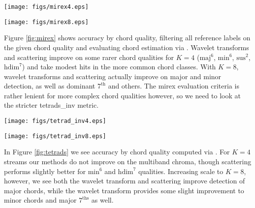 \begin{figure*}[h!]
\centering
\begin{minipage}{\columnwidth}
	\centering
	\texttt{[image: figs/mirex4.eps]}
\end{minipage}
\begin{minipage}{\columnwidth}
	\centering
	\texttt{[image: figs/mirex8.eps]}
\end{minipage}
\caption{Multiband chroma, Haar wavelet transform, and deep Haar scattering compared for $K=4$ (top) and $K=8$ (bottom) streams. Chord accuracy computed via mirex.}
\label{fig:mirex}
\end{figure*}

Figure \ref{fig:mirex} shows accuracy by chord quality, filtering all reference labels on the given chord quality and evaluating chord estimation via \mirex. Wavelet transforms and scattering improve on some rarer chord qualities for $K=4$
($\textrm{maj}^\textrm{6}$, $\textrm{min}^\textrm{6}$,
$\textrm{sus}^\textrm{2}$, $\textrm{hdim}^\textrm{7}$)
and take modest hits in the more common chord classes. With $K=8$, wavelet transforms and scattering actually improve on major and minor detection, as well as dominant $\textrm{7}^\textrm{th}$ and others. The mirex evaluation criteria is rather lenient for more complex chord qualities however, so we need to look at the stricter tetrads\_inv metric.

\begin{figure*}[h!]
\centering
\begin{minipage}{\columnwidth}
	\centering
	\texttt{[image: figs/tetrad\_inv4.eps]}
\end{minipage}
\begin{minipage}{\columnwidth}
	\centering
	\texttt{[image: figs/tetrad\_inv8.eps]}
\end{minipage}
\caption{Multiband chroma, Haar wavelet transform, and deep Haar scattering compared for $K=4$ (top) and $K=8$ (bottom) streams. Chord accuracy computed via tetrads with inversions.}
\label{fig:tetrads}
\end{figure*}

In Figure \ref{fig:tetrads} we see accuracy by chord quality computed via \tetradsinv.
For $K=4$ streams our methods do not improve on the multiband chroma,
though scattering performs slightly better for $\textrm{min}^\textrm{6}$ and $\textrm{hdim}^\textrm{7}$ qualities. Increasing scale to $K=8$, however, we see both the wavelet transform and scattering improve detection of major chords, while the wavelet transform provides some slight improvement to minor chords and major $\textrm{7}^\textrm{ths}$ as well. 
